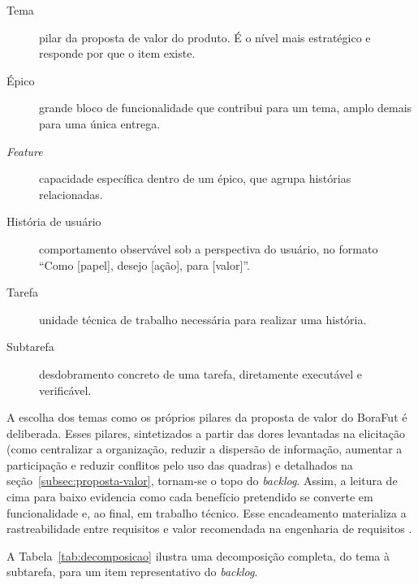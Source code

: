             \begin{description}
                \item[Tema] pilar da proposta de valor do produto. É o nível mais estratégico e responde por que o item existe.
                \item[Épico] grande bloco de funcionalidade que contribui para um tema, amplo demais para uma única entrega.
                \item[\textit{Feature}] capacidade específica dentro de um épico, que agrupa histórias relacionadas.
                \item[História de usuário] comportamento observável sob a perspectiva do usuário, no formato ``Como [papel], desejo [ação], para [valor]''.
                \item[Tarefa] unidade técnica de trabalho necessária para realizar uma história.
                \item[Subtarefa] desdobramento concreto de uma tarefa, diretamente executável e verificável.
            \end{description}

            A escolha dos temas como os próprios pilares da proposta de valor do BoraFut é deliberada. Esses pilares, sintetizados a partir das dores levantadas na elicitação (como centralizar a organização, reduzir a dispersão de informação, aumentar a participação e reduzir conflitos pelo uso das quadras) e detalhados na seção~\ref{subsec:proposta-valor}, tornam-se o topo do \textit{backlog}. Assim, a leitura de cima para baixo evidencia como cada benefício pretendido se converte em funcionalidade e, ao final, em trabalho técnico. Esse encadeamento materializa a rastreabilidade entre requisitos e valor recomendada na engenharia de requisitos \cite{sommerville2011, wiegers2013}.

            A Tabela~\ref{tab:decomposicao} ilustra uma decomposição completa, do tema à subtarefa, para um item representativo do \textit{backlog}.

